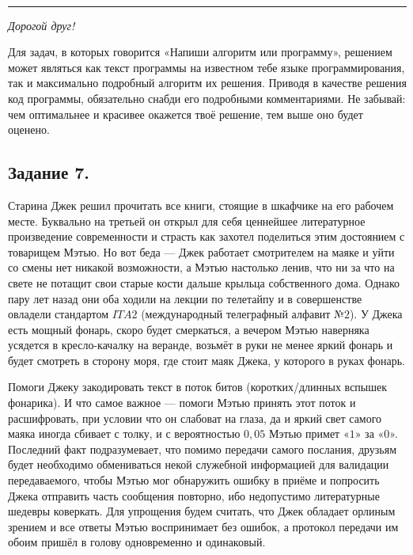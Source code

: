 \\
\rule[0.5\baselineskip]{\textwidth}{1pt}

\vspace{0\baselineskip}

\rule{0pt}{0pt}\hfill\parbox[t]{0.923\textwidth}{
{\it\small
\parskip=6pt\parindent=0pt
\noindent Дорогой друг!%

Для задач, в которых говорится «Напиши алгоритм или программу», решением может являться как текст программы на известном тебе языке программирования, так и максимально подробный алгоритм их решения. Приводя в качестве решения код программы, обязательно снабди его подробными комментариями. 
Не забывай: чем оптимальнее и красивее окажется твоё решение, тем выше оно будет оценено.
}
}
\vspace{1\baselineskip}

\subsection*{Задание 7.}
    Старина Джек решил прочитать все книги, стоящие в шкафчике на его рабочем месте. Буквально на третьей он открыл для себя ценнейшее литературное произведение современности и страсть как захотел  поделиться этим достоянием с товарищем Мэтью. Но вот беда — Джек работает смотрителем на маяке и уйти со смены нет никакой возможности, а Мэтью настолько ленив, что ни за что на свете не потащит свои старые кости дальше крыльца собственного дома. Однако пару лет назад они оба ходили на лекции по телетайпу и в совершенстве овладели стандартом $ITA2$ (международный телеграфный алфавит №$2$). У Джека есть мощный фонарь, скоро будет смеркаться, а вечером Мэтью наверняка усядется в кресло-качалку на веранде, возьмёт в руки не менее яркий фонарь и будет смотреть в сторону моря, где стоит маяк Джека, у которого в руках фонарь.
    
    
    Помоги Джеку закодировать текст в поток битов (коротких/длинных вспышек фонарика). И что самое важное — помоги Мэтью принять этот поток и расшифровать, при условии что он слабоват на глаза, да и яркий свет самого маяка иногда сбивает с толку, и с вероятностью $0,05$ Мэтью примет «$1$» за «$0$». Последний факт подразумевает, что помимо передачи самого послания, друзьям будет необходимо обмениваться некой служебной информацией для валидации передаваемого, чтобы Мэтью мог обнаружить ошибку в приёме и попросить Джека отправить часть сообщения повторно, ибо недопустимо литературные шедевры коверкать. Для упрощения будем считать, что Джек обладает орлиным зрением и все ответы Мэтью воспринимает без ошибок, а протокол передачи им обоим пришёл в голову одновременно и одинаковый.
    
